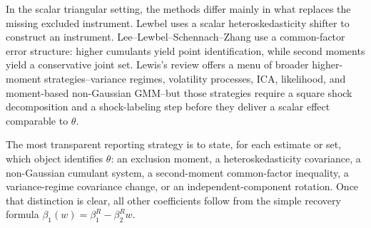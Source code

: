 \documentclass[11pt]{article}
\theoremstyle{plain}
\theoremstyle{definition}
\theoremstyle{remark}
\begin{document}
In the scalar triangular setting, the methods differ mainly in what replaces the
missing excluded instrument. Lewbel uses a scalar heteroskedasticity shifter to
construct an instrument. Lee--Lewbel--Schennach--Zhang use a common-factor error
structure: higher cumulants yield point identification, while second moments
yield a conservative joint set. Lewis's review offers a menu of broader
higher-moment strategies--variance regimes, volatility processes, ICA,
likelihood, and moment-based non-Gaussian GMM--but those strategies require a
square shock decomposition and a shock-labeling step before they deliver a
scalar effect comparable to $\theta$.

The most transparent reporting strategy is to state, for each estimate or set,
which object identifies $\theta$: an exclusion moment, a heteroskedasticity
covariance, a non-Gaussian cumulant system, a second-moment common-factor
inequality, a variance-regime covariance change, or an independent-component
rotation. Once that distinction is clear, all other coefficients follow from the
simple recovery formula $\beta_1(w)=\beta_1^R-\beta_2^Rw$.
\end{document}
